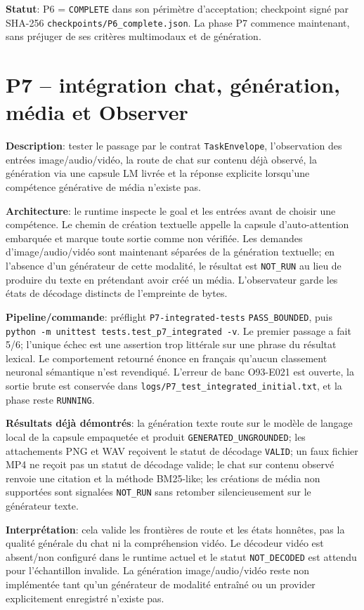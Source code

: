 \documentclass[11pt,a4paper,oneside]{report}
\begin{document}
\textbf{Statut}: P6 = \texttt{COMPLETE} dans son périmètre d'acceptation; checkpoint signé par SHA-256 \texttt{checkpoints/P6\_complete.json}. La phase P7 commence maintenant, sans préjuger de ses critères multimodaux et de génération.


\chapter{P7 -- intégration chat, génération, média et Observer}
\textbf{Description}: tester le passage par le contrat \texttt{TaskEnvelope}, l'observation des entrées image/audio/vidéo, la route de chat sur contenu déjà observé, la génération via une capsule LM livrée et la réponse explicite lorsqu'une compétence générative de média n'existe pas.

\textbf{Architecture}: le runtime inspecte le goal et les entrées avant de choisir une compétence. Le chemin de création textuelle appelle la capsule d'auto-attention embarquée et marque toute sortie comme non vérifiée. Les demandes d'image/audio/vidéo sont maintenant séparées de la génération textuelle; en l'absence d'un générateur de cette modalité, le résultat est \texttt{NOT\_RUN} au lieu de produire du texte en prétendant avoir créé un média. L'observateur garde les états de décodage distincts de l'empreinte de bytes.

\textbf{Pipeline/commande}: préflight \texttt{P7-integrated-tests} \texttt{PASS\_BOUNDED}, puis \texttt{python -m unittest tests.test\_p7\_integrated -v}. Le premier passage a fait 5/6; l'unique échec est une assertion trop littérale sur une phrase du résultat lexical. Le comportement retourné énonce en français qu'aucun classement neuronal sémantique n'est revendiqué. L'erreur de banc O93-E021 est ouverte, la sortie brute est conservée dans \texttt{logs/P7\_test\_integrated\_initial.txt}, et la phase reste \texttt{RUNNING}.

\textbf{Résultats déjà démontrés}: la génération texte route sur le modèle de langage local de la capsule empaquetée et produit \texttt{GENERATED\_UNGROUNDED}; les attachements PNG et WAV reçoivent le statut de décodage \texttt{VALID}; un faux fichier MP4 ne reçoit pas un statut de décodage valide; le chat sur contenu observé renvoie une citation et la méthode BM25-like; les créations de média non supportées sont signalées \texttt{NOT\_RUN} sans retomber silencieusement sur le générateur texte.

\textbf{Interprétation}: cela valide les frontières de route et les états honnêtes, pas la qualité générale du chat ni la compréhension vidéo. Le décodeur vidéo est absent/non configuré dans le runtime actuel et le statut \texttt{NOT\_DECODED} est attendu pour l'échantillon invalide. La génération image/audio/vidéo reste non implémentée tant qu'un générateur de modalité entraîné ou un provider explicitement enregistré n'existe pas.
\end{document}
